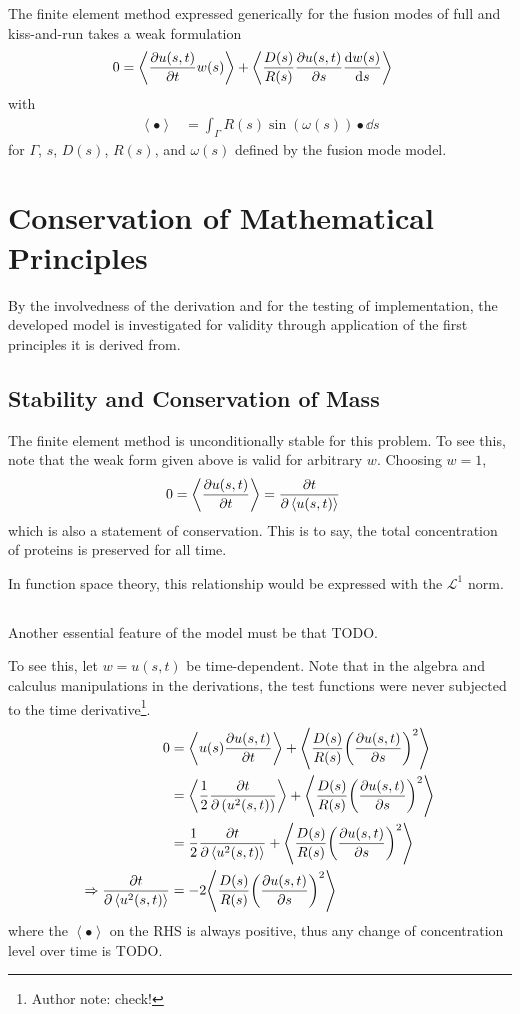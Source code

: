 \documentclass{report}
\newcommand\Par[1]{{ \left({#1}\right) }}
\newcommand\Angle[1]{{ \left\langle{#1}\right\rangle }}
\begin{document}
The finite element method expressed generically for the fusion modes of full and kiss-and-run takes a weak formulation
\begin{align*}
	0 &= \Angle{\pdv{u(s, t)}{t} w(s)} + \Angle{\frac{D(s)}{R(s)} \pdv{u(s, t)}{s} \dv{w(s)}{s}}
\end{align*}
with
\begin{align*}
	\Angle{\bullet} &= \int_\Gamma R(s) \sin\Par{\omega(s)} \bullet \dd{s}
\end{align*}
for $\Gamma$, $s$, $D(s)$, $R(s)$, and $\omega(s)$ defined by the fusion mode model.

\section{Conservation of Mathematical Principles}
By the involvedness of the derivation and for the testing of implementation, the developed model is investigated for validity through application of the first principles it is derived from.

\subsection{Stability and Conservation of Mass}
The finite element method is unconditionally stable for this problem. To see this, note that the weak form given above is valid for arbitrary $w$. Choosing $w = 1$,
\begin{align*}
	0 &= \Angle{\pdv{u(s, t)}{t}} = \pdv{t} \Angle{u(s, t)}
\end{align*}
which is also a statement of conservation. This is to say, the total concentration of proteins is preserved for all time.

In function space theory, this relationship would be expressed with the $\mathcal{L}^1$ norm.

\subsection{}
Another essential feature of the model must be that TODO.

To see this, let $w = u(s, t)$ be time-dependent. Note that in the algebra and calculus manipulations in the derivations, the test functions were never subjected to the time derivative\footnote{Author note: check!}.
\begin{align*}
	0 &= \Angle{u(s)\pdv{u(s, t)}{t}} + \Angle{\frac{D(s)}{R(s)} \Par{\pdv{u(s, t)}{s}}^2} \\
	&= \Angle{\frac{1}{2} \pdv{t}\Par{u^2(s, t)}} + \Angle{\frac{D(s)}{R(s)} \Par{\pdv{u(s, t)}{s}}^2} \\
	&= \frac{1}{2} \pdv{t} \Angle{u^2(s, t)} + \Angle{\frac{D(s)}{R(s)} \Par{\pdv{u(s, t)}{s}}^2} \\
	\Rightarrow \pdv{t} \Angle{u^2(s, t)} &= -2 \Angle{\frac{D(s)}{R(s)} \Par{\pdv{u(s, t)}{s}}^2}
\end{align*}
where the $\Angle\bullet$ on the RHS is always positive, thus any change of concentration level over time is TODO.
\end{document}
